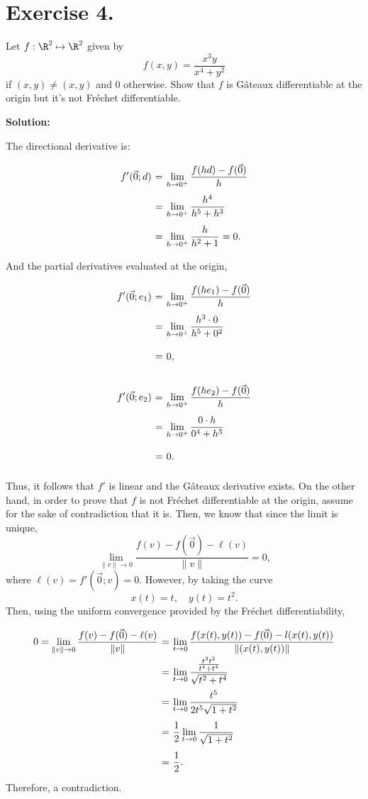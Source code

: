 \section*{Exercise 4.}

Let $f:\R^2 \mapsto \R^2$ given by 
\[ f(x,y) = \frac{x^3 y}{x^4+y^2} \]
if $(x,y)\neq (x,y)$ and $0$ otherwise. Show that $f$ is Gâteaux differentiable at the origin but it's not Fréchet differentiable.

\textbf{Solution:}

The directional derivative is:
\[ \everymath{\displaystyle}
\arraycolsep=1.8pt\def\arraystretch{2.5}
\begin{array}{rcl}
    f'(\vec{0};d) & = & \lim_{h\to 0^+} \frac{f(hd)-f(\vec{0})}{h}\\
    & = & \lim_{h\to 0^+} \frac{h^4}{h^5+ h^3}\\
    & = & \lim_{h\to 0^+} \frac{h}{h^2+1} = 0.
\end{array} \]

And the partial derivatives evaluated at the origin,
\[ \everymath{\displaystyle}
\arraycolsep=1.8pt\def\arraystretch{2.5}
\begin{array}{rcl}
    f'(\vec{0};e_1) & = & \lim_{h\to 0^+} \frac{f(he_1)-f(\vec{0})}{h}\\
    & = & \lim_{h\to 0^+} \frac{h^3\cdot 0}{h^5+ 0^2}\\
    & = & 0,
\end{array} \]

\[ \everymath{\displaystyle}
\arraycolsep=1.8pt\def\arraystretch{2.5}
\begin{array}{rcl}
    f'(\vec{0};e_2) & = & \lim_{h\to 0^+} \frac{f(he_2)-f(\vec{0})}{h}\\
    & = & \lim_{h\to 0^+} \frac{0\cdot h}{0^4+ h^3}\\
    & = & 0.
\end{array} \]

Thus, it follows that $f'$ is linear and the Gâteaux derivative exists. On the other hand, in order to prove that $f$ is not Fréchet differentiable at the origin, assume for the sake of contradiction that it is. Then, we know that since the limit is unique,
\[ \lim_{\|v\|\to 0} \frac{f(v)-f(\vec{0})-\ell(v)}{\|v\|} = 0, \]
where $\ell(v) = f'(\vec{0};v) = 0$. However, by taking the curve
\[ x(t) = t,\hspace{1em} y(t) = t^2. \]
Then, using the uniform convergence provided by the Fréchet differentiability, 
\[ \everymath{\displaystyle}
\arraycolsep=1.8pt\def\arraystretch{2.5}
\begin{array}{rcl}
    0 = \lim_{\|v\|\to 0} \frac{f(v)-f(\vec{0})-\ell(v)}{\|v\|} & = & \lim_{t\to 0} \frac{f(x(t),y(t))- f(\vec{0}) - l(x(t),y(t))}{\|(x(t),y(t))\|}\\
     & = & \lim_{t\to 0} \frac{\frac{t^3t^2}{t^4 + t^4}}{\sqrt{t^2 + t^4}}\\
    & = & \lim_{t\to 0} \frac{t^5}{2t^5 \sqrt{1+t^2}}\\
    & = & \frac{1}{2} \lim_{t\to 0} \frac{1}{\sqrt{1+t^2}}\\
     & = & \frac{1}{2}.
\end{array} \]
Therefore, a contradiction.
